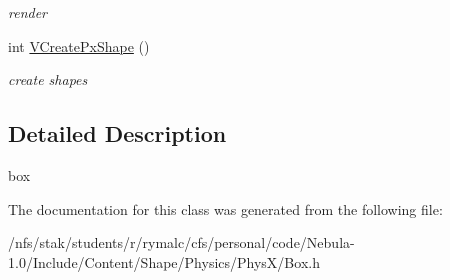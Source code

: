 \begin{DoxyCompactItemize}
\begin{DoxyCompactList}\small\item\em render \item\end{DoxyCompactList}\item 
\hypertarget{classContent_1_1Shape_1_1Box_a89d0868023ac2cb56070b1310afd46f6}{
int \hyperlink{classContent_1_1Shape_1_1Box_a89d0868023ac2cb56070b1310afd46f6}{VCreatePxShape} ()}
\label{classContent_1_1Shape_1_1Box_a89d0868023ac2cb56070b1310afd46f6}

\begin{DoxyCompactList}\small\item\em create shapes \item\end{DoxyCompactList}\end{DoxyCompactItemize}


\subsection{Detailed Description}
box 

The documentation for this class was generated from the following file:\begin{DoxyCompactItemize}
\item 
/nfs/stak/students/r/rymalc/cfs/personal/code/Nebula-\/1.0/Include/Content/Shape/Physics/PhysX/Box.h\end{DoxyCompactItemize}
